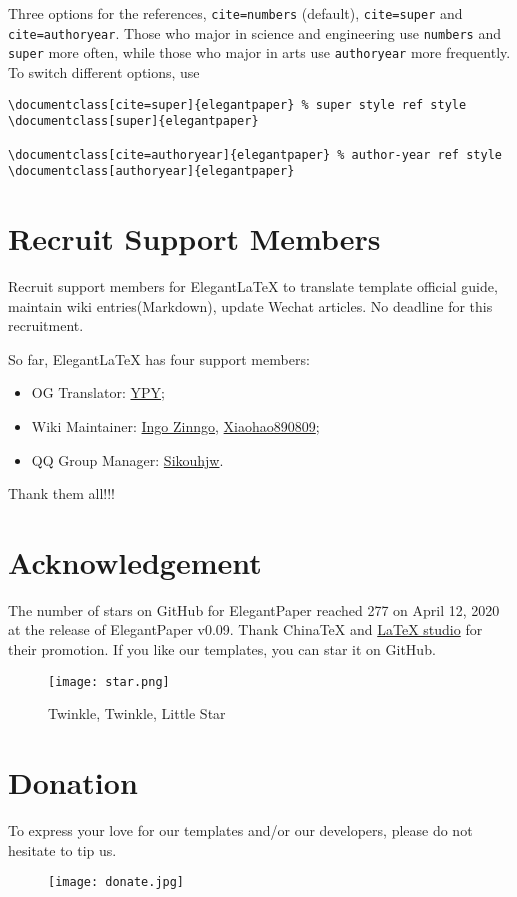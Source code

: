 \documentclass[11pt,en,cite=authoryear]{elegantpaper}
\begin{document}
Three options for the references, \lstinline{cite=numbers} (default), \lstinline{cite=super} and \lstinline{cite=authoryear}. Those who major in science and engineering use \lstinline{numbers} and \lstinline{super} more often, while those who major in arts use \lstinline{authoryear} more frequently. To switch different options, use
\begin{lstlisting}
\documentclass[cite=super]{elegantpaper} % super style ref style
\documentclass[super]{elegantpaper}

\documentclass[cite=authoryear]{elegantpaper} % author-year ref style
\documentclass[authoryear]{elegantpaper}
\end{lstlisting}

\section{Recruit Support Members}

Recruit support members for Elegant\LaTeX{} to translate template official guide, maintain wiki entries(Markdown), update Wechat articles. No deadline for this recruitment.

So far, Elegant\LaTeX{} has four support members:
\begin{itemize}
	\item OG Translator: \href{https://github.com/peggy2006xzyz}{YPY};
	\item Wiki Maintainer: \href{https://github.com/izinngo}{Ingo Zinngo}, \href{https://github.com/xiaohao890809}{Xiaohao890809};
	\item QQ Group Manager: \href{https://github.com/sikouhjw}{Sikouhjw}.
\end{itemize}

Thank them all!!!

\section{Acknowledgement}
The number of stars on GitHub for ElegantPaper reached 277 on April 12, 2020 at the release of ElegantPaper v0.09. Thank China\TeX{} and \href{http://www.latexstudio.net/}{\LaTeX{} studio} for their promotion. If you like our templates, you can star it on GitHub.
\begin{figure}[!ht]
	\centering
	\texttt{[image: star.png]}
	\caption{Twinkle, Twinkle, Little Star}
\end{figure}

\section{Donation}
To express your love for our templates and/or our developers, please do not hesitate to tip us.
\begin{figure}[!htbp]
	\centering
	\texttt{[image: donate.jpg]}
\end{figure}
\end{document}
